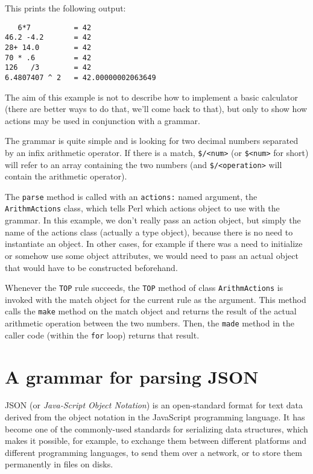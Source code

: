 This prints the following output:

\begin{verbatim}
   6*7          = 42
46.2 -4.2       = 42
28+ 14.0        = 42
70 * .6         = 42
126   /3        = 42
6.4807407 ^ 2   = 42.00000002063649
\end{verbatim}

The aim of this example is not to describe how to implement 
a basic calculator (there are better ways to do that, we'll 
come back to that), but only to show how actions may be 
used in conjunction with a grammar.

The grammar is quite simple and is looking for two decimal numbers 
separated by an infix arithmetic operator. If there is a 
match, \verb'$/<num>' (or \verb'$<num>' for short) will refer to an 
array containing the two numbers (and \verb'$/<operation>' 
will contain the arithmetic operator).

The {\tt parse} 
method is called with an {\tt actions:} named argument, 
the {\tt ArithmActions} class, which tells Perl which 
actions object to use with the grammar. In this example, we 
don't really pass an action object, but simply the name 
of the actions class (actually a type object), 
because there is no need to instantiate an object. In 
other cases, for example if there was a need to initialize 
or somehow use some object attributes, we would need to pass 
an actual object that would have to be constructed beforehand.

Whenever the {\tt TOP} rule succeeds, the {\tt TOP} method 
of class {\tt ArithmActions} is invoked with the match 
object for the current rule as the argument.  This method 
calls the {\tt make} method on the match object and 
returns the result of the actual arithmetic operation 
between the two numbers. Then, the {\tt made} method 
in the caller code (within the {\tt for} loop) returns 
that result.

\section{A grammar for parsing JSON}

JSON (or \emph{Java-Script Object Notation}) is an 
open-standard format for text data derived from 
the object notation in the JavaScript programming language. 
It has become one of the commonly-used standards for 
serializing data structures, which makes it possible, for 
example, to exchange them between different platforms and 
different programming languages, to send them over a network, 
or to store them permanently in files on disks.

